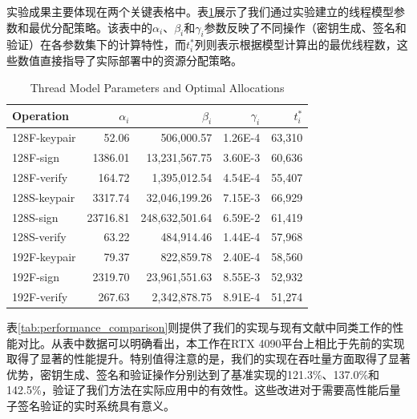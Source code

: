 \documentclass{article}
\begin{document}
实验成果主要体现在两个关键表格中。表\ref{tab:thread_model_params}展示了我们通过实验建立的线程模型参数和最优分配策略。该表中的$\alpha_i$、$\beta_i$和$\gamma_i$参数反映了不同操作（密钥生成、签名和验证）在各参数集下的计算特性，而$t_i^*$列则表示根据模型计算出的最优线程数，这些数值直接指导了实际部署中的资源分配策略。

\begin{table}[h]
\centering
\footnotesize
\caption{Thread Model Parameters and Optimal Allocations}
\label{tab:thread_model_params}
\begin{tabular}{@{}lrrrr@{}}
\toprule
\textbf{Operation} & \boldmath$\alpha_i$ & \boldmath$\beta_i$ & \boldmath$\gamma_i$ & \boldmath$t_i^*$ \\
\midrule
128F-keypair & 52.06 & 506,000.57 & 1.26E-4 & 63,310 \\
128F-sign & 1386.01 & 13,231,567.75 & 3.60E-3 & 60,636 \\
128F-verify & 164.72 & 1,395,012.54 & 4.54E-4 & 55,407 \\
128S-keypair & 3317.74 & 32,046,199.26 & 7.15E-3 & 66,929 \\
128S-sign & 23716.81 & 248,632,501.64 & 6.59E-2 & 61,419 \\
128S-verify & 63.22 & 484,914.46 & 1.44E-4 & 57,968 \\
192F-keypair & 79.37 & 822,859.78 & 2.40E-4 & 58,560 \\
192F-sign & 2319.70 & 23,961,551.63 & 8.55E-3 & 52,932 \\
192F-verify & 267.63 & 2,342,878.75 & 8.91E-4 & 51,274 \\
\bottomrule
\end{tabular}
\end{table}

表\ref{tab:performance_comparison}则提供了我们的实现与现有文献中同类工作的性能对比。从表中数据可以明确看出，本工作在RTX 4090平台上相比于先前的实现取得了显著的性能提升。特别值得注意的是，我们的实现在吞吐量方面取得了显著优势，密钥生成、签名和验证操作分别达到了基准实现的121.3\%、137.0\%和142.5\%，验证了我们方法在实际应用中的有效性。这些改进对于需要高性能后量子签名验证的实时系统具有意义。
\end{document}

